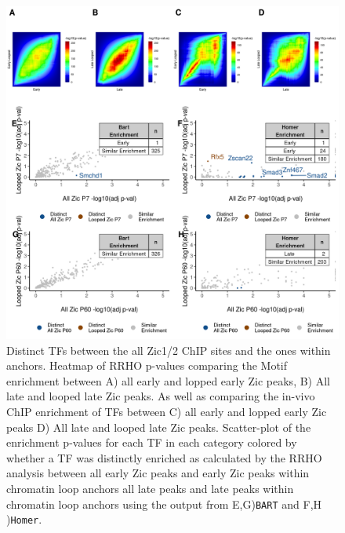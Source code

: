 \documentclass[fleqn,10pt]{wlscirep}
\begin{document}
\begin{figure}[ht]
\centering
\includegraphics[width=.95\textwidth]{../figures/supp_figure_rrho_allvlooped.png}
\caption{Distinct TFs between the all Zic1/2 ChIP sites and the ones within anchors. Heatmap of RRHO p-values comparing the Motif enrichment between A) all early and lopped early Zic peaks, B) All late and looped late Zic peaks. As well as comparing the in-vivo ChIP enrichment of TFs between C) all early and lopped early Zic peaks D) All late and looped late Zic peaks. Scatter-plot of the enrichment p-values for each TF in each category colored by whether a TF was distinctly enriched as calculated by the RRHO analysis between all early Zic peaks and early Zic peaks within chromatin loop anchors  all late peaks and late peaks within chromatin loop anchors using the output from E,G)\texttt{BART} and F,H )\texttt{Homer}.  }
\label{fig:loopved_all}
\end{figure}
\end{document}
